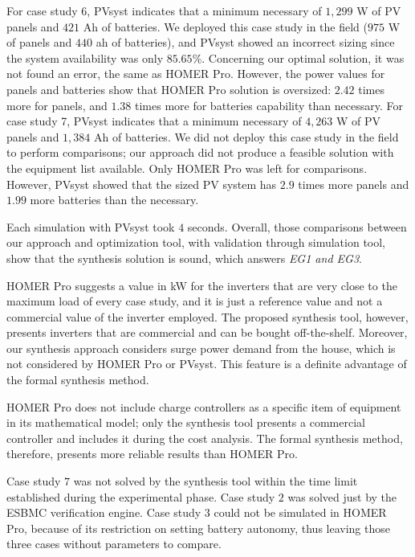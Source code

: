 \documentclass[runningheads]{llncs}
\begin{document}
For case study 6, PVsyst indicates that a minimum necessary of $1,299$ W of PV panels and $421$ Ah of batteries. We deployed this case study in the field ($975$ W of panels and $440$ ah of batteries), and PVsyst showed an incorrect sizing since the system availability was only $85.65$\%. Concerning our optimal solution, it was not found an error, the same as HOMER Pro. However, the power values for panels and batteries show that HOMER Pro solution is oversized: $2.42$ times more for panels, and $1.38$ times more for batteries capability than necessary.
For case study 7, PVsyst indicates that a minimum necessary of $4,263$ W of PV panels and $1,384$ Ah of batteries. We did not deploy this case study in the field to perform comparisons; our approach did not produce a feasible solution with the equipment list available. Only HOMER Pro was left for comparisons. However, PVsyst showed that the sized PV system has $2.9$ times more panels and $1.99$ more batteries than the necessary.

Each simulation with PVsyst took $4$ seconds. Overall, those comparisons between our approach and optimization tool, with validation through simulation tool, show that the synthesis solution is sound, which answers \textit{EG1 and EG3}.

HOMER Pro suggests a value in kW for the inverters that are very close to the maximum load of every case study, and it is just a reference value and not a commercial value of the inverter employed. The proposed synthesis tool, however, presents inverters that are commercial and can be bought off-the-shelf. Moreover, our synthesis approach considers surge power demand from the house, which is not considered by HOMER Pro or PVsyst. This feature is a definite advantage of the formal synthesis method.

HOMER Pro does not include charge controllers as a specific item of equipment in its mathematical model; only the synthesis tool presents a commercial controller and includes it during the cost analysis. The formal synthesis method, therefore, presents more reliable results than HOMER Pro.

Case study $7$ was not solved by the synthesis tool within the time limit established during the experimental phase. Case study $2$ was solved just by the ESBMC verification engine. Case study $3$ could not be simulated in HOMER Pro, because of its restriction on setting battery autonomy, thus leaving those three cases without parameters to compare.
\end{document}
